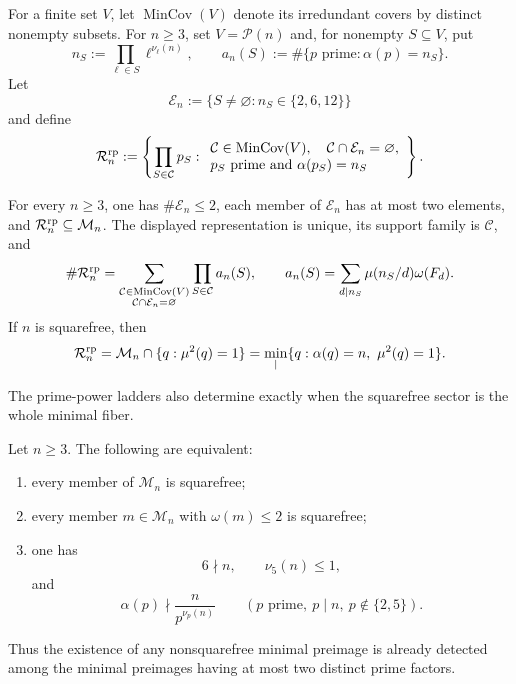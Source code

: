 For a finite set $V$, let $\operatorname{MinCov}(V)$ denote its irredundant
covers by distinct nonempty subsets.  For $n\geq3$, set $V=\mathcal P(n)$
and, for nonempty $S\subseteq V$, put
\[
 n_S:=\prod_{\ell\in S}\ell^{\nu_\ell(n)},\qquad
 a_n(S):=\#\{p\text{ prime}:\alpha(p)=n_S\}.
\]
Let
\[
 \mathcal E_n:=\{S\ne\varnothing:n_S\in\{2,6,12\}\}
\]
and define
\[
 \mathcal R_n^{\rm rp}:=
 \left\{\prod_{S\in\mathcal C}p_S:
 \begin{array}{l}
 \mathcal C\in\operatorname{MinCov}(V),\quad
 \mathcal C\cap\mathcal E_n=\varnothing,\\
 p_S\text{ prime and }\alpha(p_S)=n_S
 \end{array}\right\}.
\]

\begin{theorem}
\label{thm:rank-pure-universality}
For every $n\geq3$, one has $\#\mathcal E_n\leq2$, each member of
$\mathcal E_n$ has at most two elements, and
$\mathcal R_n^{\rm rp}\subseteq\mathcal M_n$.  The displayed representation
is unique, its support family is $\mathcal C$, and
\begin{equation}\label{eq:rank-pure-weighted-sector}
 \#\mathcal R_n^{\rm rp}=
 \sum_{\substack{\mathcal C\in\operatorname{MinCov}(V)\\
                   \mathcal C\cap\mathcal E_n=\varnothing}}
 \prod_{S\in\mathcal C}a_n(S),
 \qquad
 a_n(S)=\sum_{d\mid n_S}\mu(n_S/d)\omega(F_d).
\end{equation}
If $n$ is squarefree, then
\begin{equation}\label{eq:canonical-squarefree-slice}
 \mathcal R_n^{\rm rp}
 =\mathcal M_n\cap\{q:\mu^2(q)=1\}
 =\min_{\mid}\{q:\alpha(q)=n,\ \mu^2(q)=1\}.
\end{equation}
\end{theorem}

The prime-power ladders also determine exactly when the squarefree sector is
the whole minimal fiber.

\begin{theorem}
\label{thm:squarefree-fiber-criterion}
Let $n\geq3$.  The following are equivalent:
\begin{enumerate}[label=\textup{(\roman*)}]
\item every member of $\mathcal M_n$ is squarefree;
\item every member $m\in\mathcal M_n$ with $\omega(m)\leq2$ is squarefree;
\item one has
\[
 6\nmid n,\qquad \nu_5(n)\leq1,
\]
and
\[
 \alpha(p)\nmid \frac{n}{p^{\nu_p(n)}}
 \qquad
 (p\text{ prime},\ p\mid n,\ p\notin\{2,5\}).
\]
\end{enumerate}
Thus the existence of any nonsquarefree minimal preimage is already detected
among the minimal preimages having at most two distinct prime factors.
\end{theorem}

